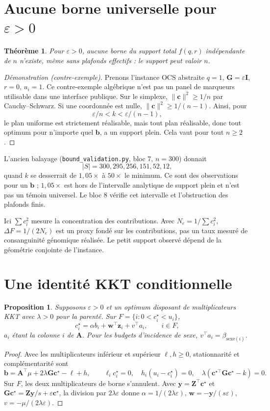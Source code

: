 \documentclass[11pt]{article}
\theoremstyle{plain}
\newtheorem{theoreme}{Théorème}
\newtheorem{proposition}{Proposition}
\newcommand{\tp}{^{\top}}
\newcommand{\bc}{\mathbf{c}}
\newcommand{\bb}{\mathbf{b}}
\newcommand{\bG}{\mathbf{G}}
\newcommand{\bZ}{\mathbf{Z}}
\newcommand{\bA}{\mathbf{A}}
\newcommand{\by}{\mathbf{y}}
\newcommand{\bw}{\mathbf{w}}
\newcommand{\bze}{\mathbf{z}}
\begin{document}
\section{Aucune borne universelle pour \texorpdfstring{$\varepsilon > 0$}{eps>0}}\label{sec:noridge}
\begin{theoreme}\label{thm:noridge}
Pour $\varepsilon>0$, aucune borne du support total $f(q,r)$ indépendante de $n$ n'existe, même sans plafonds effectifs : le support peut valoir $n$.
\end{theoreme}
\begin{proof}[Démonstration (contre-exemple)]
Prenons l'instance OCS abstraite $q=1$, $\bG=\varepsilon\mathbf{I}$, $r=0$, $u_i=1$. Ce contre-exemple algébrique n'est pas un panel de marqueurs utilisable dans une interface publique. Sur le simplexe, $\|\bc\|^2\ge1/n$ par Cauchy--Schwarz. Si une coordonnée est nulle, $\|\bc\|^2\ge1/(n-1)$. Ainsi, pour
\[
 \varepsilon/n<k<\varepsilon/(n-1),
\]
le plan uniforme est strictement réalisable, mais tout plan réalisable, donc tout optimum pour n'importe quel $\bb$, a un support plein. Cela vaut pour tout $n\ge2$.
\end{proof}

L'ancien balayage (\texttt{bound\_validation.py}, bloc 7, $n=300$) donnait
\[|S|=300,295,256,151,52,12,\]
quand $k$ se desserrait de $1{,}05\times$ à $50\times$ le minimum. Ce sont des observations pour un $\bb$ ; $1{,}05\times$ est hors de l'intervalle analytique de support plein et n'est pas un témoin universel. Le bloc 8 vérifie cet intervalle et l'obstruction des plafonds finis.

Ici $\sum c_i^2$ mesure la concentration des contributions. Avec $N_e=1/\sum c_i^2$, $\Delta F=1/(2N_e)$ est un proxy fondé sur les contributions, pas un taux mesuré de consanguinité génomique réalisée. Le petit support observé dépend de la géométrie conjointe de l'instance.

\section{Une identité KKT conditionnelle}\label{sec:kkt}
\begin{proposition}\label{prop:kkt}
Supposons $\varepsilon>0$ et un optimum disposant de multiplicateurs KKT avec $\lambda>0$ pour la parenté. Sur $F=\{i:0<c_i^\star<u_i\}$,
\[
 c_i^\star=\alpha b_i+\bw\tp\bze_i+v\tp a_i,\qquad i\in F,
\]
$a_i$ étant la colonne $i$ de $\bA$. Pour les budgets d'incidence de sexe, $v\tp a_i=\beta_{\mathrm{sexe}(i)}$.
\end{proposition}
\begin{proof}
Avec les multiplicateurs inférieur et supérieur $\ell,h\ge0$, stationnarité et complémentarité sont
\[
 \bb=\bA\tp\mu+2\lambda\bG\bc^\star-\ell+h,\qquad
 \ell_i c_i^\star=0,\quad h_i(u_i-c_i^\star)=0,\quad
 \lambda(\bc^{\star\top}\bG\bc^\star-k)=0.
\]
Sur $F$, les deux multiplicateurs de borne s'annulent. Avec $\by=\bZ\tp\bc^\star$ et $\bG\bc^\star=\bZ\by/s+\varepsilon\bc^\star$, la division par $2\lambda\varepsilon$ donne $\alpha=1/(2\lambda\varepsilon)$, $\bw=-\by/(s\varepsilon)$, $v=-\mu/(2\lambda\varepsilon)$.
\end{proof}
\end{document}

